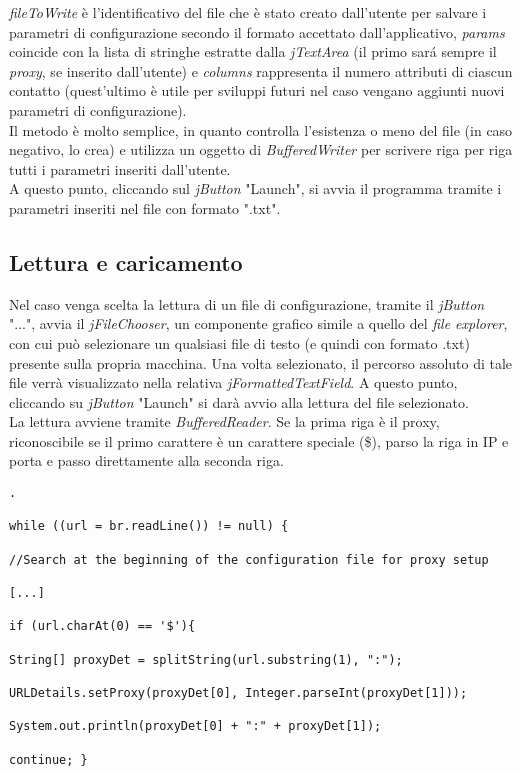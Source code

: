 \textit{fileToWrite} \`{e} l'identificativo del file che \`{e} stato creato dall'utente per salvare i parametri di configurazione secondo il formato accettato dall'applicativo, \textit{params} coincide con la lista di stringhe estratte dalla \textit{jTextArea} (il primo sar\'a sempre il \textit{proxy}, se inserito dall'utente) e \textit{columns} rappresenta il numero attributi di ciascun contatto (quest'ultimo \`{e} utile per sviluppi futuri nel caso vengano aggiunti nuovi parametri di configurazione).\\


Il metodo \`{e} molto semplice, in quanto controlla l'esistenza o meno del file (in caso negativo, lo crea) e utilizza un oggetto di \textit{BufferedWriter} per scrivere riga per riga tutti i parametri inseriti dall'utente.\\


A questo punto, cliccando sul \textit{jButton} "Launch", si avvia il programma tramite i parametri inseriti nel file con formato ".txt".


\subsection{Lettura e caricamento}


Nel caso venga scelta la lettura di un file di configurazione, tramite il \textit{jButton} "...", avvia il \textit{jFileChooser}, un componente grafico simile a quello del \textit{file explorer}, con cui pu\`{o} selezionare un qualsiasi file di testo (e quindi con formato .txt) presente sulla propria macchina. Una volta selezionato, il percorso assoluto di tale file verr\`{a} visualizzato nella relativa \textit{jFormattedTextField}. A questo punto, cliccando su \textit{jButton} "Launch" si dar\`{a} avvio alla lettura del file selezionato.\\


La lettura avviene tramite \textit{BufferedReader}. Se la prima riga \`{e} il proxy, riconoscibile se il primo carattere \`{e} un carattere speciale (\$), parso la riga in IP e porta e passo direttamente alla seconda riga. 

\begin{lstlisting}.

while ((url = br.readLine()) != null) {

//Search at the beginning of the configuration file for proxy setup

[...]

if (url.charAt(0) == '$'){

String[] proxyDet = splitString(url.substring(1), ":");

URLDetails.setProxy(proxyDet[0], Integer.parseInt(proxyDet[1]));

System.out.println(proxyDet[0] + ":" + proxyDet[1]);

continue; }

\end{lstlisting}



